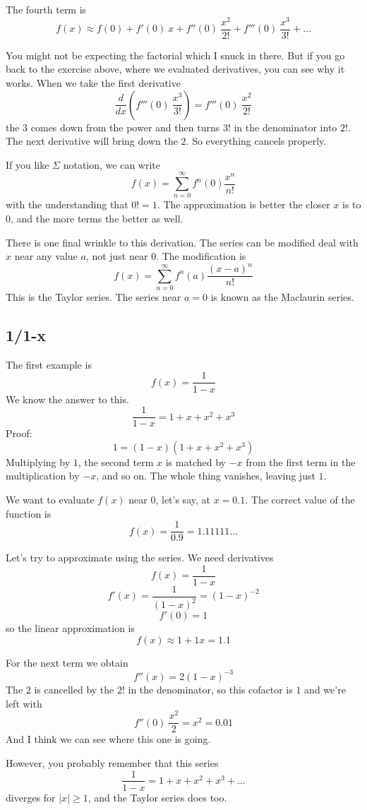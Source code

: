 \documentclass[11pt, oneside]{article}
\begin{document}
The fourth term is
\[ f(x) \approx f(0) + f'(0)\ x + f''(0)\ \frac{x^2}{2!}  + f'''(0)\ \frac{x^3}{3!} + \dots \]

You might not be expecting the factorial which I snuck in there.  But if you go back to the exercise above, where we evaluated derivatives, you can see why it works.  When we take the first derivative 
\[ \frac{d}{dx} (f'''(0)\ \frac{x^3}{3!}) =  f'''(0)\ \frac{x^2}{2!}\]
the $3$ comes down from the power and then turns $3!$ in the denominator into $2!$.  The next derivative will bring down the $2$.  So everything cancels properly.  

If you like $\Sigma$ notation, we can write
\[ f(x) = \sum_{n=0}^{\infty} f^n(0) \frac{x^n}{n!} \]
with the understanding that $0! = 1$.  The approximation is better the closer $x$ is to $0$, and the more terms the better as well.  

There is one final wrinkle to this derivation.  The series can be modified deal with $x$ near any value $a$, not just near $0$.  The modification is
\[ f(x) = \sum_{n=0}^{\infty} f^n(a) \frac{(x-a)^n}{n!} \]
This is the Taylor series.  The series near $a=0$ is known as the Maclaurin series.

\subsection*{1/1-x}
The first example is
\[ f(x) = \frac{1}{1-x} \]
We know the answer to this.
\[ \frac{1}{1-x} = 1 + x + x^2 + x^3 \]
Proof:
\[ 1 = (1-x)(1 + x + x^2 + x^3) \]
Multiplying by $1$, the second term $x$ is matched by $-x$ from the first term in the multiplication by $-x$, and so on.  The whole thing vanishes, leaving just $1$.

We want to evaluate $f(x)$ near $0$, let's say, at $x=0.1$.  The correct value of the function is
\[ f(x) = \frac{1}{0.9} = 1.11111 \dots \]

Let's try to approximate using the series.  We need derivatives
\[ f(x) = \frac{1}{1-x} \]
\[ f'(x) = \frac{1}{(1-x)^2} = (1-x)^{-2} \]
\[ f'(0) = 1 \]
so the linear approximation is
\[ f(x) \approx 1 + 1x = 1.1 \]

For the next term we obtain
\[ f''(x) = 2(1-x)^{-3} \]
The $2$ is cancelled by the $2!$ in the denominator, so this cofactor is $1$ and we're left with
\[ f''(0)\ \frac{x^2}{2} = x^2 = 0.01 \]
And I think we can see where this one is going.

However, you probably remember that this series
\[ \frac{1}{1 - x} = 1 + x + x^2 + x^3 + \dots \]
diverges for $|x| \ge 1$, and the Taylor series does too.
\end{document}
